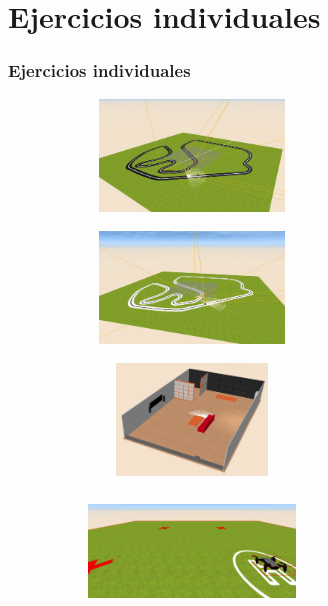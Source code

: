 \documentclass[xcolor={table}]{beamer}
\begin{document}
		\section{Ejercicios individuales}
		\begin{frame}
			\frametitle{Ejercicios individuales}
	  \begin{figure}[ht]
        \centering
          \begin{subfigure}{\textwidth}
            \includegraphics[width=5.5cm, height=3cm]{img/pibot_vision.JPG}
        \label{fig:vision}
        \end{subfigure}\hfill
        \begin{subfigure}{\textwidth}
            \includegraphics[width=5.5cm, height=3cm]{img/siguelineas_ir.JPG}
        \label{fig:ir}
        \end{subfigure}\hfill
        \begin{subfigure}{\textwidth}
            \includegraphics[width=5.5cm, height=3cm]{img/bump&go.png}
        \label{fig:chocagira}
        \end{subfigure}\hfill
        \begin{subfigure}{\textwidth}
            \includegraphics[width=5.5cm, height=3cm]{img/cuadradoDrone.png}
        \label{fig:cuadrado}
        \end{subfigure}
            \label{fig:ejercicios}
            \end{figure}
         \end{frame}
		
\end{document}
